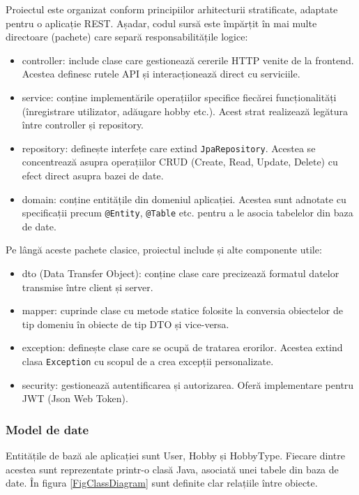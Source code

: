 \par
Proiectul este organizat conform principiilor arhitecturii stratificate, adaptate pentru o aplicație REST. 
Așadar, codul sursă este împărțit în mai multe directoare (pachete) care separă responsabilitățile logice: 
\begin{itemize}
    \item controller: include clase care gestionează cererile HTTP venite de la frontend. Acestea definesc rutele API și interacționează direct cu serviciile.
    \item service: conține implementările operațiilor specifice fiecărei funcționalități (înregistrare utilizator, adăugare hobby etc.). Acest strat realizează legătura între controller și repository. 
    \item repository: definește interfețe care extind \texttt{JpaRepository}. Acestea se concentrează asupra operațiilor CRUD (Create, Read, Update, Delete) cu efect direct asupra bazei de date.
    \item domain: conține entitățile din domeniul aplicației. Acestea sunt adnotate cu specificații precum \texttt{@Entity}, \texttt{@Table} etc. pentru a le asocia tabelelor din baza de date.
\end{itemize}  
Pe lângă aceste pachete clasice, proiectul include și alte componente utile:
\begin{itemize} 
    \item dto (Data Transfer Object): conține clase care precizează formatul datelor transmise între client și server.
    \item mapper: cuprinde clase cu metode statice folosite la conversia obiectelor de tip domeniu în obiecte de tip DTO și vice-versa.
    \item exception: definește clase care se ocupă de tratarea erorilor. Acestea extind clasa \texttt{Exception} cu scopul de a crea excepții personalizate.
    \item security: gestionează autentificarea și autorizarea. Oferă implementare pentru JWT (Json Web Token).
\end{itemize}
\subsubsection*{Model de date}
Entitățile de bază ale aplicației sunt User, Hobby și HobbyType. Fiecare dintre acestea sunt reprezentate printr-o clasă Java, asociată unei tabele din baza de date.
În figura \ref{FigClassDiagram} sunt definite clar relațiile între obiecte.

